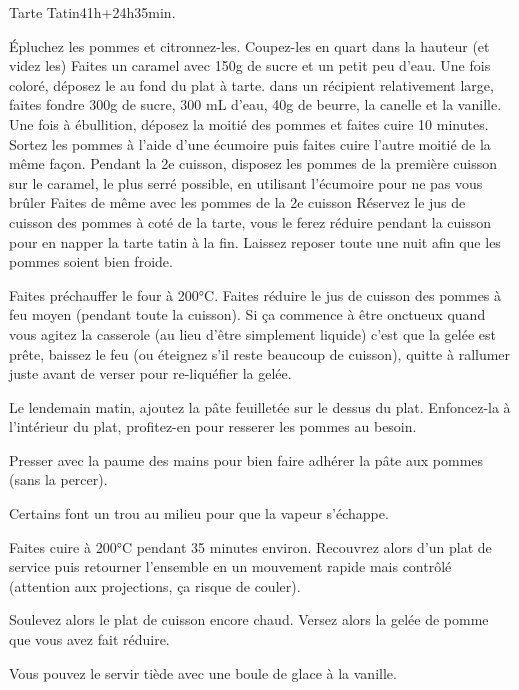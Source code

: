 {\begin{recette}{Tarte Tatin}{4}{1h+24h}{35min.}
\begin{preparation}
\etape Épluchez les pommes et citronnez-les.
\etape Coupez-les en quart dans la hauteur (et videz les)
\etape Faites un caramel avec 150g de sucre et un petit peu d'eau. Une fois coloré, déposez le au fond du plat à tarte. 
\etape dans un récipient relativement large, faites fondre 300g de sucre, 300 mL d'eau, 40g de beurre, la canelle et la 
vanille. 
\etape Une fois à ébullition, déposez la moitié des pommes et faites cuire 10 minutes. 
\etape Sortez les pommes à l'aide d'une écumoire puis faites 
cuire l'autre moitié de la même façon. Pendant la 2e cuisson, disposez les pommes de la première cuisson sur le caramel, le plus serré possible, en utilisant l'écumoire pour ne pas vous brûler
\etape Faites de même avec les pommes de la 2e cuisson
\etape Réservez le jus de cuisson des pommes à coté de la tarte, vous le ferez réduire pendant la cuisson pour en napper la 
tarte tatin à la fin.
\etape Laissez reposer toute une nuit afin que les pommes soient bien froide.
\end{preparation}

\begin{cuisson}
Faites préchauffer le four à 200°C. Faites réduire le jus de cuisson des pommes à feu moyen (pendant toute la cuisson). Si ça 
commence à être onctueux quand vous agitez la casserole (au lieu d'être simplement liquide) c'est que la gelée est prête, 
baissez le feu (ou éteignez s'il reste beaucoup de cuisson), quitte à rallumer juste avant de verser pour re-liquéfier la gelée.

Le lendemain matin, ajoutez la pâte feuilletée sur le dessus du plat. Enfoncez-la à l'intérieur du plat, profitez-en pour 
resserer les pommes au besoin. 

Presser avec la paume des mains pour bien faire adhérer la pâte aux pommes (sans la percer). 

Certains font un trou au milieu pour que la vapeur s'échappe.

Faites cuire à 200°C pendant 35 minutes environ. Recouvrez alors d'un plat de service puis retourner l'ensemble en 
un mouvement rapide mais contrôlé (attention aux projections, ça risque de couler).

Soulevez alors le plat de cuisson encore chaud. Versez alors la gelée de pomme que vous avez fait réduire. 

Vous pouvez le servir tiède avec une boule de glace à la vanille.


\end{cuisson}
\end{recette}

}

